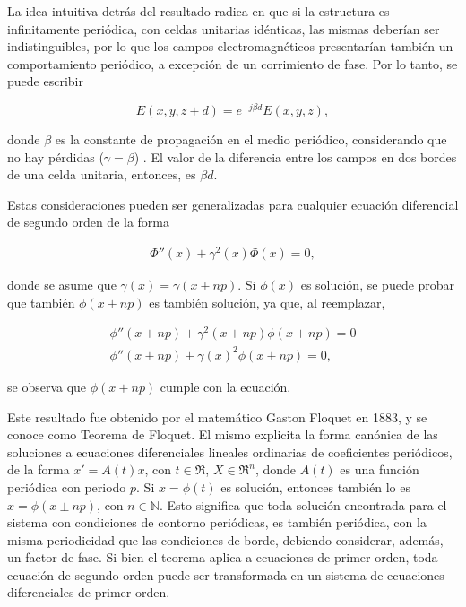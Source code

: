 La idea intuitiva detrás del resultado radica en que si la estructura es infinitamente periódica, con celdas unitarias idénticas, las mismas deberían ser indistinguibles, por lo que los campos electromagnéticos presentarían también un comportamiento periódico, a excepción de un corrimiento de fase. Por lo tanto, se puede escribir

\begin{equation}
\label{eq:comportamiento-periodico-campo-bloch}
E(x,y,z+d) = e^{-j \beta d} E(x,y,z),
\end{equation}

donde $\beta$ es la constante de propagación en el medio periódico, considerando que no hay pérdidas ($\gamma = \beta$) \cite{Capolino:TheoryPhenomenaMetamaterials}. El valor de la diferencia entre los campos en dos bordes de una celda unitaria, entonces, es $\beta d$.

Estas consideraciones pueden ser generalizadas para cualquier ecuación diferencial de segundo orden de la forma

\begin{align}
\Phi'' (x) + \gamma^2(x) \Phi(x) = 0,
\end{align}

donde se asume que $\gamma(x) = \gamma(x+np)$. Si $\phi(x)$ es solución, se puede probar que también $\phi(x+np)$ es también solución, ya que, al reemplazar,

\begin{align}
\phi'' (x+np) + \gamma^2(x+np) \phi(x+np) = 0 \\
\phi'' (x+np) + \gamma(x)^2 \phi(x+np) = 0,
\end{align}

se observa que $\phi(x+np)$ cumple con la ecuación.

Este resultado fue obtenido por el matemático Gaston Floquet en 1883, y se conoce como Teorema de Floquet. El mismo explicita la forma canónica de las soluciones a ecuaciones diferenciales lineales ordinarias de coeficientes periódicos, de la forma $x' = A(t)x$, con $t \in \Re$, $X \in \Re^n$, donde $A(t)$ es una función periódica con periodo $p$. Si $x=\phi(t)$ es solución, entonces también lo es $x=\phi(x\pm np)$, con $n \in \mathbb{N}$. Esto significa que toda solución encontrada para el sistema con condiciones de contorno periódicas, es también periódica, con la misma periodicidad que las condiciones de borde, debiendo considerar, además, un factor de fase. Si bien el teorema aplica a ecuaciones de primer orden, toda ecuación de segundo orden puede ser transformada en un sistema de ecuaciones diferenciales de primer orden.

